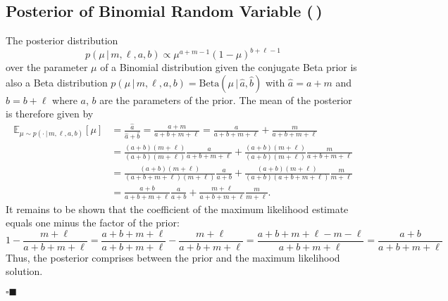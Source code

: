 \documentclass[11pt, a4paper]{scrartcl}
\newcommand{\E}{\mathbb{E}}
\newcommand{\given}{\,\vert\,}
\newcommand{\qedeot}{\hfill\(\square\blacksquare\)}
\newcommand{\diffstar}{\texorpdfstring{\raisebox{-1pt}{\resizebox{!}{8pt}{\(\star\)}}}{*}}
\newcommand{\twostar}  {(\diffstar\,\diffstar)}
\begin{document}
		\subsection{Posterior of Binomial Random Variable  \twostar}
			The posterior distribution
			\begin{equation}
				p(\mu \given m, \ell, a, b) \propto \mu^{a + m - 1} (1 - \mu)^{b + \ell - 1}
			\end{equation}
			over the parameter \(\mu\) of a Binomial distribution given the conjugate Beta prior is also a Beta distribution \( p(\mu \given m, \ell, a, b) = \mathrm{Beta}(\mu \given \hat{a}, \hat{b}) \) with \( \hat{a} = a + m \) and \( \hat{b} = b + \ell \) where \(a\), \(b\) are the parameters of the prior. The mean of the posterior is therefore given by
			\begin{align}
				\E_{\mu \sim p(\cdot \given m, \ell, a, b)}[\mu]
					&= \frac{\hat{a}}{\hat{a} + \hat{b}}
					 = \frac{a + m}{a + b + m + \ell}
					 = \frac{a}{a + b + m + \ell} + \frac{m}{a + b + m + \ell} \\
					&= \frac{(a + b) (m + \ell)}{(a + b) (m + \ell)} \frac{a}{a + b + m + \ell} + \frac{(a + b) (m + \ell)}{(a + b) (m + \ell)} \frac{m}{a + b + m + \ell} \\
					&= \frac{(a + b) (m + \ell)}{(a + b + m + \ell) (m + \ell)} \frac{a}{a + b} + \frac{(a + b) (m + \ell)}{(a + b) (a + b + m + \ell)} \frac{m}{m + \ell} \\
					&= \frac{a + b}{a + b + m + \ell} \frac{a}{a + b} + \frac{m + \ell}{a + b + m + \ell} \frac{m}{m + \ell}.
			\end{align}
			It remains to be shown that the coefficient of the maximum likelihood estimate equals one minus the factor of the prior:
			\begin{equation}
				1 - \frac{m + \ell}{a + b + m + \ell}
					= \frac{a + b + m + \ell}{a + b + m + \ell} - \frac{m + \ell}{a + b + m + \ell}
					= \frac{a + b + m + \ell - m - \ell}{a + b + m + \ell}
					= \frac{a + b}{a + b + m + \ell}
			\end{equation}
			Thus, the posterior comprises between the prior and the maximum likelihood solution.

			\qedeot
\end{document}
